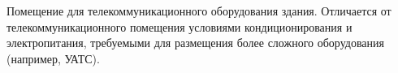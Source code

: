 Помещение для телекоммуникационного
оборудования здания. Отличается от телекоммуникационного
помещения условиями кондиционирования и электропитания,
требуемыми для размещения более сложного 
оборудования (например, УАТС).
